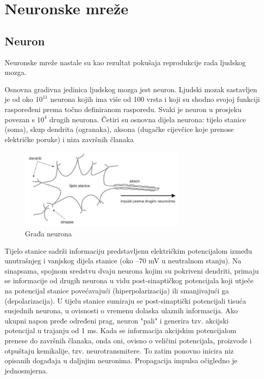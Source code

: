 \section{Neuronske mreže}

\subsection{Neuron}

Neuronske mreže nastale su kao rezultat pokušaja reprodukcije rada ljudskog mozga.

Osnovna gradivna jedinica ljudskog mozga jest neuron. Ljudski mozak sastavljen je od oko $10^{11}$ neurona kojih ima više od 100 vrsta i koji su shodno svojoj funkciji raspoređeni prema točno definiranom 
rasporedu. Svaki je neuron u prosjeku povezan s $10^4$ drugih neurona. Četiri su osnovna dijela neurona: tijelo stanice (soma), skup dendrita (ogranaka), aksona (dugačke cijevčice koje prenose električke poruke) i niza završnih članaka 

\begin{figure}[htb]
\centering
\includegraphics[width=8cm]{img/Neuron.png}
\caption{Građa neurona \citep{cupicZbirka}}
\label{img:human-neuron}
\end{figure}

Tijelo stanice sadrži informaciju predstavljenu električkim potencijalom između unutrašnjeg i vanjskog dijela stanice (oko –70 mV u neutralnom stanju). Na sinapsama, spojnom sredstvu dvaju neurona kojim su pokriveni dendriti, primaju se informacije od drugih neurona u vidu post-sinaptičkog potencijala koji utječe na potencijal stanice povećavajući (hiperpolarizacija) ili smanjivajući ga (depolarizacija). U tijelu stanice sumiraju se post-sinaptički potencijali tisuća susjednih neurona, u ovisnosti o vremenu dolaska ulaznih informacija. Ako ukupni napon pređe određeni prag, neuron "pali" i generira tzv. akcijski potencijal u trajanju od 1 ms. Kada se informacija akcijskim potencijalom prenese do završnih članaka, onda oni, ovisno o veličini potencijala, proizvode i otpuštaju kemikalije, tzv. neurotransmitere. To zatim ponovno inicira niz opisanih događaja u daljnjim neuronima. Propagacija impulsa očigledno je jednosmjerna. 

